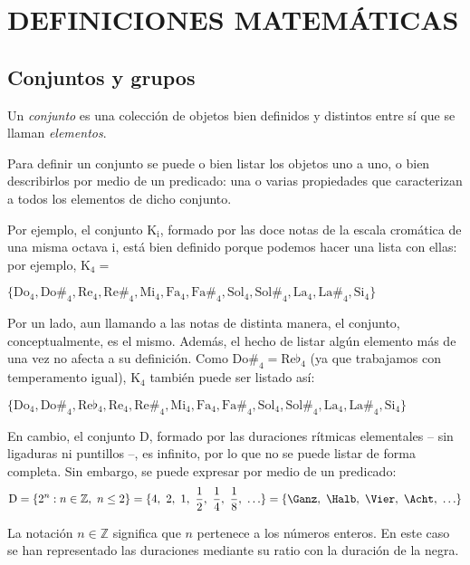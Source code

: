 \section{DEFINICIONES MATEMÁTICAS}\label{ch:permutaciones}
	\subsection{Conjuntos y grupos}
		Un \emph{conjunto} es una colección de objetos bien definidos y distintos entre sí que se llaman \emph{elementos}. 
	
		Para definir un conjunto se puede o bien listar los objetos uno a uno, o bien describirlos por medio de un predicado: una o varias propiedades que caracterizan a todos los elementos de dicho conjunto.

		Por ejemplo, el conjunto K$_{\mbox{i}}$, formado por las doce notas de la escala cromática de una misma octava i, está bien definido porque podemos hacer una lista con ellas: por ejemplo, $\mbox{K}_{\mbox{4}} = $
		
		{$\{\mbox{Do}_{\mbox{4}}, \mbox{Do\#}_{\mbox{4}}, \mbox{Re}_{\mbox{4}}, \mbox{Re\#}_{\mbox{4}}, \mbox{Mi}_{\mbox{4}}, \mbox{Fa}_{\mbox{4}}, \mbox{Fa\#}_{\mbox{4}}, \mbox{Sol}_{\mbox{4}}, \mbox{Sol\#}_{\mbox{4}}, \mbox{La}_{\mbox{4}}, \mbox{La\#}_{\mbox{4}}, \mbox{Si}_{\mbox{4}}\}$}
		
		Por un lado, aun llamando a las notas de distinta manera, el conjunto, conceptualmente, es el mismo. Además, el hecho de listar algún elemento más de una vez no afecta a su definición. Como $\mbox{Do\#}_{\mbox{4}} = \mbox{Re}\flat_{\mbox{4}}$ ({ya que trabajamos con temperamento igual}), $\mbox{K}_{\mbox{4}}$ también puede ser listado así:
		
		{$\{\mbox{Do}_{\mbox{4}}, \mbox{Do\#}_{\mbox{4}}, \mbox{Re}\flat_{\mbox{4}}, \mbox{Re}_{\mbox{4}}, \mbox{Re\#}_{\mbox{4}}, \mbox{Mi}_{\mbox{4}}, \mbox{Fa}_{\mbox{4}}, \mbox{Fa\#}_{\mbox{4}}, \mbox{Sol}_{\mbox{4}}, \mbox{Sol\#}_{\mbox{4}}, \mbox{La}_{\mbox{4}}, \mbox{La\#}_{\mbox{4}}, \mbox{Si}_{\mbox{4}}\}$}
	
		En cambio, el conjunto D, formado por las duraciones rítmicas elementales -- sin ligaduras ni puntillos --, es infinito, por lo que no se puede listar de forma completa. Sin embargo, se puede expresar por medio de un predicado:		
		\[\mbox{D} =\{2^n:n\in\mathbb{Z},\ n\le 2\} = \{4,\ 2,\ 1,\ \dfrac{1}{2},\ \dfrac{1}{4},\ \dfrac{1}{8},\ \ldots\} = \{\Ganz,\ \Halb,\ \Vier,\ \textsf{\Acht},\ \ldots\}\]
		
		La notación $n\in\mathbb{Z}$ significa que $n$ pertenece a los números enteros. En este caso se han representado las duraciones mediante su ratio con la duración de la negra.
	
